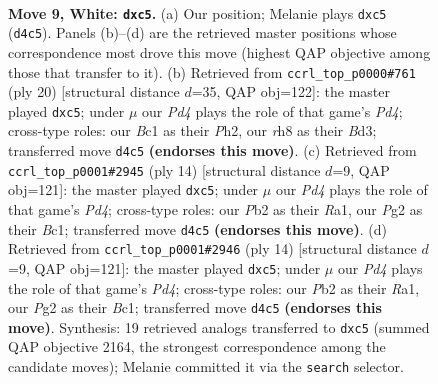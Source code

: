 \documentclass[11pt]{article}
\begin{document}
\clearpage

\begin{figure}[p]\centering
\begin{subfigure}{0.46\textwidth}\centering
\resizebox{\linewidth}{!}{%
\newchessgame
\chessboard[
  setfen={r1bqkb1r/pp3pp1/4pn2/2p4p/3P3P/3B1N2/PPP2PP1/R1BQK2R w KQkq - 0 9},
  showmover=false,
  pgfstyle=straightmove, color=movearrow, markmove={d4-c5}
]}
\caption{}
\end{subfigure}\hfill
\begin{subfigure}{0.46\textwidth}\centering
\resizebox{\linewidth}{!}{%
\newchessgame
\chessboard[
  setfen={r1bqk2r/pp2bpp1/4pn1p/2p5/3P4/3B1N2/PPPB1PPP/R2QK2R w KQkq - 0 11},
  showmover=false,
  pgfstyle=straightmove, color=movearrow, markmove={d4-c5}
]}
\caption{}
\end{subfigure}
\\[4pt]
\begin{subfigure}{0.46\textwidth}\centering
\resizebox{\linewidth}{!}{%
\newchessgame
\chessboard[
  setfen={r1bqkb1r/pp3ppp/4pn2/2p5/3P4/3B1N2/PPP2PPP/R1BQK2R w KQkq - 0 8},
  showmover=false,
  pgfstyle=straightmove, color=movearrow, markmove={d4-c5}
]}
\caption{}
\end{subfigure}\hfill
\begin{subfigure}{0.46\textwidth}\centering
\resizebox{\linewidth}{!}{%
\newchessgame
\chessboard[
  setfen={r1bqkb1r/pp3ppp/4pn2/2p5/3P4/3B1N2/PPP2PPP/R1BQK2R w KQkq - 0 8},
  showmover=false,
  pgfstyle=straightmove, color=movearrow, markmove={d4-c5}
]}
\caption{}
\end{subfigure}
\caption{\textbf{Move 9, White: \texttt{dxc5}.} (a) Our position; Melanie plays \texttt{dxc5} (\texttt{d4c5}). Panels (b)--(d) are the retrieved master positions whose correspondence most drove this move (highest QAP objective among those that transfer to it). (b) Retrieved from \texttt{ccrl\_top\_p0000\#761} (ply 20) [structural distance $d$=35, QAP obj=122]: the master played \texttt{dxc5}; under $\mu$ our \emph{Pd4} plays the role of that game's \emph{Pd4}; cross-type roles: our \emph{B}c1 as their \emph{P}h2, our \emph{r}h8 as their \emph{B}d3; transferred move \texttt{d4c5} \textbf{(endorses this move)}. (c) Retrieved from \texttt{ccrl\_top\_p0001\#2945} (ply 14) [structural distance $d$=9, QAP obj=121]: the master played \texttt{dxc5}; under $\mu$ our \emph{Pd4} plays the role of that game's \emph{Pd4}; cross-type roles: our \emph{P}b2 as their \emph{R}a1, our \emph{P}g2 as their \emph{B}c1; transferred move \texttt{d4c5} \textbf{(endorses this move)}. (d) Retrieved from \texttt{ccrl\_top\_p0001\#2946} (ply 14) [structural distance $d$=9, QAP obj=121]: the master played \texttt{dxc5}; under $\mu$ our \emph{Pd4} plays the role of that game's \emph{Pd4}; cross-type roles: our \emph{P}b2 as their \emph{R}a1, our \emph{P}g2 as their \emph{B}c1; transferred move \texttt{d4c5} \textbf{(endorses this move)}. Synthesis: 19 retrieved analogs transferred to \texttt{dxc5} (summed QAP objective 2164, the strongest correspondence among the candidate moves); Melanie committed it via the \texttt{search} selector.}
\label{fig:thought-m16}
\end{figure}
\end{document}
